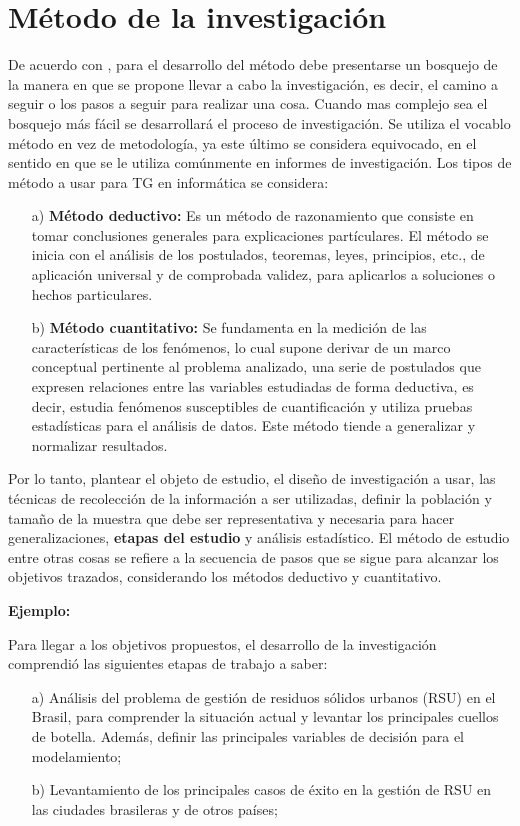 \section{Método de la investigación}
De acuerdo con \cite{Erica}, para el desarrollo del método debe presentarse un bosquejo de la manera  en que se propone llevar a cabo la investigación, es decir, el camino a seguir o los pasos a seguir para realizar una cosa. Cuando mas complejo sea el bosquejo  más fácil se desarrollará el proceso de investigación. Se utiliza el vocablo método en vez de metodología, ya este último se considera equivocado, en el sentido en que se le utiliza comúnmente en informes de investigación. 
\vskip 0.3cm
Los tipos de método a usar para TG en informática se considera:
\begin{enumerate}
\item[a)] {\bf Método deductivo:} Es un método de razonamiento que consiste en tomar conclusiones generales para explicaciones partículares. El método se inicia con el análisis de los postulados, teoremas, leyes, principios, etc., de aplicación universal y de comprobada validez, para aplicarlos  a soluciones o hechos particulares. 

\item[b)]{\bf Método cuantitativo:} Se fundamenta en la medición de las características de los fenómenos, lo cual supone derivar de un marco conceptual pertinente al problema analizado, una serie de postulados que expresen relaciones entre las variables estudiadas de forma deductiva, es decir, estudia fenómenos susceptibles de cuantificación y utiliza pruebas estadísticas para el análisis de datos. Este método tiende a generalizar y normalizar resultados. 
\end{enumerate}

Por lo tanto, plantear el objeto de estudio, el diseño de investigación a usar, las técnicas de recolección de la información a ser utilizadas, definir la población y tamaño de la muestra que debe ser representativa y necesaria para hacer generalizaciones, {\bf etapas del estudio} y análisis estadístico. El método de estudio entre otras cosas se refiere a la secuencia de pasos que se sigue para alcanzar los objetivos trazados, considerando los métodos deductivo y cuantitativo.\par
\vskip 0.3cm





{\bf Ejemplo:}\par
\vskip 0.1cm
Para llegar a los objetivos propuestos, el desarrollo de la investigación comprendió las siguientes etapas de trabajo a saber:
\begin{enumerate}
\item[a)] Análisis del problema de gestión de residuos sólidos urbanos (RSU) en el Brasil, para comprender la situación actual y levantar los principales cuellos de botella. Además, definir las principales variables de decisión para el modelamiento;
\item[b)]	Levantamiento de los principales casos de éxito en la gestión de RSU en las ciudades brasileras y de otros países;  
\end{enumerate}


